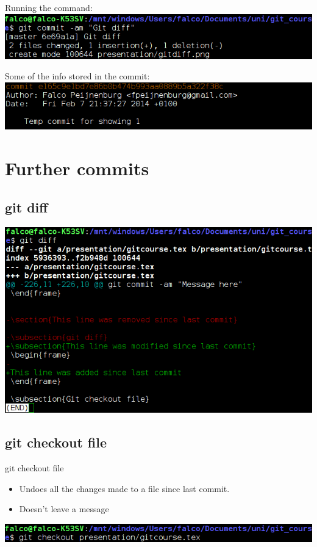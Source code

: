 \documentclass[10pt,a4paper]{beamer}
\begin{document}
\begin{frame}
Running the command:
\includegraphics[width=\linewidth]{gitcommitdone.png}

Some of the info stored in the commit:
\includegraphics[width=\linewidth]{gitlogcommit.png}
\end{frame}

\section{Further commits}

\subsection{git diff}
\begin{frame}
\includegraphics[width=\linewidth]{gitdiff.png}
\end{frame}

\subsection{git checkout file}
\begin{frame}{git checkout file}
\begin{itemize}
\item Undoes all the changes made to a file since last commit.
\item Doesn't leave a message
\end{itemize}
\includegraphics[width=\linewidth]{gitcheckoutfile.png}
\end{frame}
\end{document}
